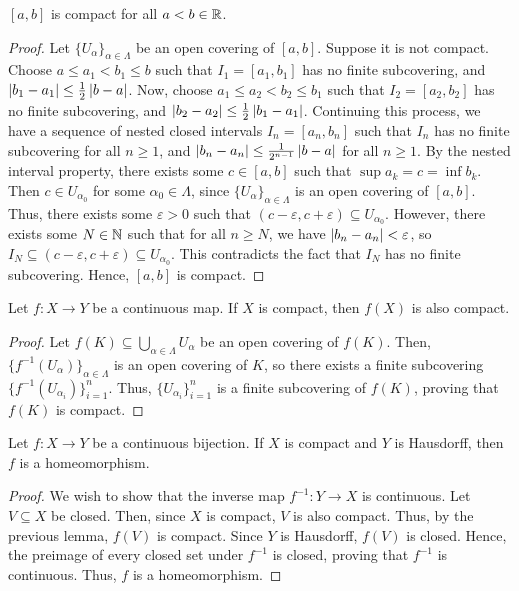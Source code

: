 \begin{theorem}
    $[a,b]$ is compact for all $a < b \in \mathbb{R}$.
\end{theorem}
\begin{proof}
    Let $\{U_{\alpha}\}_{\alpha \in \Lambda}$ be an open covering of $[a,b]$. Suppose it is not compact. Choose $a \leq a_{1} < b_{1} \leq b$ such that $I_{1} = [a_{1},b_{1}]$ has no finite subcovering, and $\left| b_{1}-a_{1} \right| \leq \frac{1}{2}\left| b-a \right|$. Now, choose $a_{1} \leq a_{2} < b_{2} \leq b_{1}$ such that $I_{2} = [a_{2},b_{2}]$ has no finite subcovering, and $\left| b_{2}-a_{2} \right| \leq \frac{1}{2}\left| b_{1}-a_{1} \right|$. Continuing this process, we have a sequence of nested closed intervals $I_{n} = [a_{n}, b_{n}]$ such that $I_{n}$ has no finite subcovering for all $n \geq 1$, and $\left| b_{n}-a_{n} \right| \leq \frac{1}{2^{n-1}}\left| b-a \right|$ for all $n \geq 1$. By the nested interval property, there exists some $c \in [a,b]$ such that $\sup a_{k} = c = \inf b_{k}$. Then $c \in U_{\alpha_{0}}$ for some $\alpha_{0} \in \Lambda$, since $\{U_{\alpha}\}_{\alpha \in \Lambda}$ is an open covering of $[a,b]$. Thus, there exists some $\varepsilon > 0$ such that $(c-\varepsilon, c+\varepsilon) \subseteq U_{\alpha_{0}}$. However, there exists some $N \in \mathbb{N}$ such that for all $n \geq N$, we have $\left| b_{n}-a_{n} \right| < \varepsilon$, so $I_{N} \subseteq (c-\varepsilon, c+\varepsilon) \subseteq U_{\alpha_{0}}$. This contradicts the fact that $I_{N}$ has no finite subcovering. Hence, $[a,b]$ is compact.
\end{proof}

\begin{lemma}
    Let $f:X \to Y$ be a continuous map. If $X$ is compact, then $f(X)$ is also compact.
\end{lemma}
\begin{proof}
    Let $f(K) \subseteq \bigcup_{\alpha \in \Lambda} U_{\alpha}$ be an open covering of $f(K)$. Then, $\{f^{-1}(U_{\alpha})\}_{\alpha \in \Lambda}$ is an open covering of $K$, so there exists a finite subcovering $\{f^{-1}(U_{\alpha_{i}})\}_{i=1}^{n}$. Thus, $\{U_{\alpha_{i}}\}_{i=1}^{n}$ is a finite subcovering of $f(K)$, proving that $f(K)$ is compact.
\end{proof}

\begin{theorem}
    Let $f:X \to Y$ be a continuous bijection. If $X$ is compact and $Y$ is Hausdorff, then $f$ is a homeomorphism.
\end{theorem}
\begin{proof}
    We wish to show that the inverse map $f^{-1} : Y \to X$ is continuous. Let $V \subseteq X$ be closed. Then, since $X$ is compact, $V$ is also compact. Thus, by the previous lemma, $f(V)$ is compact. Since $Y$ is Hausdorff, $f(V)$ is closed. Hence, the preimage of every closed set under $f^{-1}$ is closed, proving that $f^{-1}$ is continuous. Thus, $f$ is a homeomorphism.
\end{proof}

